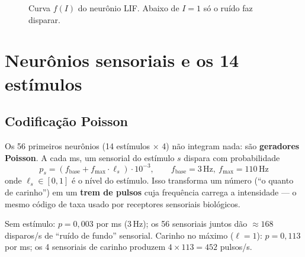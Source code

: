 \documentclass[11pt,a4paper]{article}
\newcommand{\ms}{\,\mathrm{ms}}
\newcommand{\Hz}{\,\mathrm{Hz}}
\begin{document}
\begin{figure}[h]
\centering
{}
\caption{Curva $f(I)$ do neurônio LIF. Abaixo de $I=1$ só o ruído faz disparar.}
\end{figure}

\section{Neurônios sensoriais e os 14 estímulos}\label{sec:sensorial}

\subsection{Codificação Poisson}

Os 56 primeiros neurônios (14 estímulos $\times$ 4) não integram nada: são \textbf{geradores Poisson}. A cada ms, um sensorial do
estímulo $s$ dispara com probabilidade
\begin{equation}
p_s = \left(f_\text{base} + f_\text{max}\cdot \ell_s\right)\cdot 10^{-3}, \qquad f_\text{base} = 3\Hz,\ f_\text{max} = 110\Hz
\end{equation}
onde $\ell_s \in [0,1]$ é o nível do estímulo. Isso transforma um número (“o quanto de carinho”) em um \textbf{trem de pulsos} cuja
frequência carrega a intensidade — o mesmo código de taxa usado por receptores sensoriais biológicos.

\begin{exemplo}
Sem estímulo: $p = 0{,}003$ por ms (3\,Hz); os 56 sensoriais juntos dão $\approx 168$ disparos/s de “ruído de fundo” sensorial.
Carinho no máximo ($\ell=1$): $p = 0{,}113$ por ms; os 4 sensoriais de carinho produzem $4 \times 113 = 452$ pulsos/s.
\end{exemplo}
\end{document}
